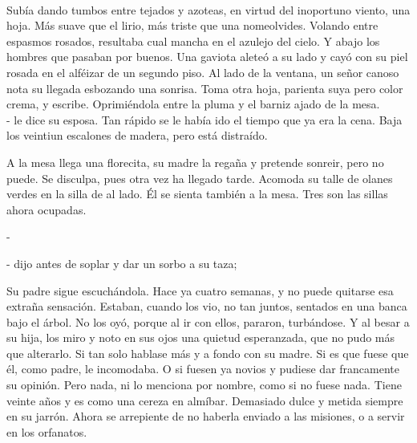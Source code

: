 \\[0.1cm]

Subía dando tumbos entre tejados y azoteas, en virtud del inoportuno viento, una hoja. Más suave que el lirio, más triste que una nomeolvides. Volando entre espasmos rosados, resultaba cual mancha en el azulejo del cielo. Y abajo los hombres que pasaban por buenos. Una gaviota aleteó a su lado y cayó con su piel rosada en el alféizar de un segundo piso. Al lado de la ventana, un señor canoso nota su llegada esbozando una sonrisa. Toma otra hoja, parienta suya pero color crema, y escribe. Oprimiéndola entre la pluma y el barniz ajado de la mesa.\\[0.2cm]

-  le dice su esposa. Tan rápido se le había ido el tiempo que ya era la cena. Baja los veintiun escalones de madera, pero está distraído.

A la mesa llega una florecita, su madre la regaña y pretende sonreir, pero no puede. Se disculpa, pues otra vez ha llegado tarde. Acomoda su talle de olanes verdes en la silla de al lado. Él se sienta también a la mesa. Tres son las sillas ahora ocupadas.

- 

-  dijo antes de soplar y dar un sorbo a su taza; 

Su padre sigue escuchándola. Hace ya cuatro semanas, y no puede quitarse esa extraña sensación.  Estaban, cuando los vio, no tan juntos, sentados en una banca bajo el árbol. No los oyó, porque al ir con ellos, pararon, turbándose. Y al besar a su hija, los miro y noto en sus ojos una quietud esperanzada, que no pudo más que alterarlo. Si tan solo hablase más y a fondo con su madre. Si es que fuese que él, como padre, le incomodaba. O si fuesen ya novios y pudiese dar francamente su opinión. Pero nada, ni lo menciona por nombre, como si no fuese nada. Tiene veinte años y es como una cereza en almíbar. Demasiado dulce y metida siempre en su jarrón. Ahora se arrepiente de no haberla enviado a las misiones, o a servir en los orfanatos.

